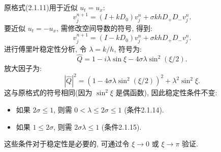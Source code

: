 \documentclass{article}
\begin{document}
        \subsubsection{}
            原格式(2.1.11)用于近似 $u_t = u_x$:
            \begin{equation*}
                v_j^{n+1} = (I + kD_0)v_j^n + \sigma kh D_+ D_- v_j^n.
            \end{equation*}
            要近似 $u_t = -u_x$, 需修改空间导数的符号, 得到:
            \begin{equation*}
                v_j^{n+1} = (I - kD_0)v_j^n + \sigma kh D_+ D_- v_j^n.
            \end{equation*}
            进行傅里叶稳定性分析, 令 $\lambda = k/h$, 符号为:
            \begin{equation*}
                \hat{Q} = 1 - i\lambda \sin \xi - 4\sigma\lambda \sin^2(\xi/2).
            \end{equation*}
            放大因子为:
            \begin{equation*}
                |\hat{Q}|^2 = \left(1 - 4\sigma\lambda \sin^2(\xi/2)\right)^2 + \lambda^2 \sin^2 \xi.
            \end{equation*}
            这与原格式的符号相同(因为 $\sin^2 \xi$ 是偶函数), 因此稳定性条件不变:
            \begin{itemize}
                \item 如果 $2\sigma \leq 1$, 则需 $0 < \lambda \leq 2\sigma \leq 1$ (条件2.1.14).
                \item 如果 $1 \leq 2\sigma$, 则需 $2\sigma\lambda \leq 1$ (条件2.1.15).
            \end{itemize}
            这些条件对于稳定性是必要的, 可通过令 $\xi \to 0$ 或 $\xi \to \pi$ 验证.
\end{document}
